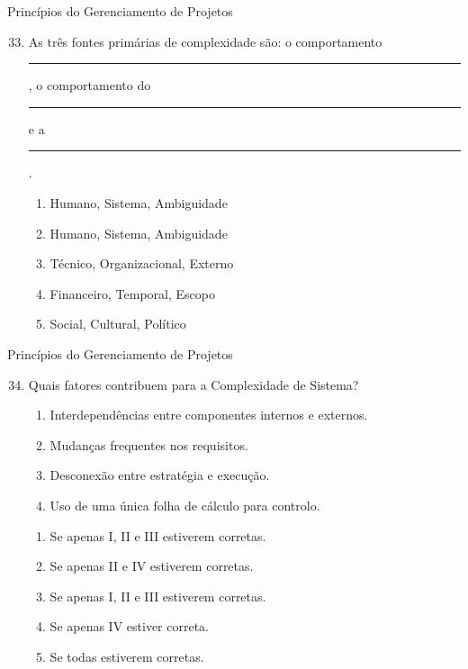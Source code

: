 \documentclass{beamer}
\begin{document}
\begin{frame}{Princípios do Gerenciamento de Projetos}
	\begin{enumerate}
		\setcounter{enumi}{32}
		\justifying
		\item As três fontes primárias de complexidade são: o comportamento \rule{50pt}{1pt}, o comportamento do \rule{50pt}{1pt} e a \rule{50pt}{1pt}.
		\begin{enumerate}[a]
			\item Humano, Sistema, Ambiguidade
			\item \alert<2>{Humano, Sistema, Ambiguidade}
			\item Técnico, Organizacional, Externo
			\item Financeiro, Temporal, Escopo
			\item Social, Cultural, Político
		\end{enumerate}
	\end{enumerate}
\end{frame}

\begin{frame}{Princípios do Gerenciamento de Projetos}
	\begin{enumerate}
		\setcounter{enumi}{33}
		\justifying
		\item Quais fatores contribuem para a Complexidade de Sistema?
		\begin{enumerate}[I]
			\item Interdependências entre componentes internos e externos.
			\item Mudanças frequentes nos requisitos.
			\item Desconexão entre estratégia e execução.
			\item Uso de uma única folha de cálculo para controlo.
		\end{enumerate}
		\begin{enumerate}[a]
			\item Se apenas I, II e III estiverem corretas.
			\item Se apenas II e IV estiverem corretas.
			\item \alert<2>{Se apenas I, II e III estiverem corretas.}
			\item Se apenas IV estiver correta.
			\item Se todas estiverem corretas.
		\end{enumerate}
	\end{enumerate}
\end{frame}
\end{document}
